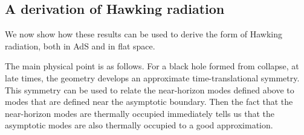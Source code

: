 \documentclass[12pt]{article}
\begin{document}
\subsection{A derivation of Hawking radiation \label{hawkingderiv}}
We now show how these results can be used to derive the form of Hawking radiation, both in AdS and in flat space.

The main physical point is as follows.  For a black hole formed from collapse, at late times, the geometry develops an approximate time-translational symmetry. This symmetry can be used to relate the near-horizon modes defined above to modes that are defined near the asymptotic boundary.  Then the fact that the near-horizon modes are thermally occupied immediately tells us that the asymptotic modes are also thermally occupied to a good approximation.
\end{document}
